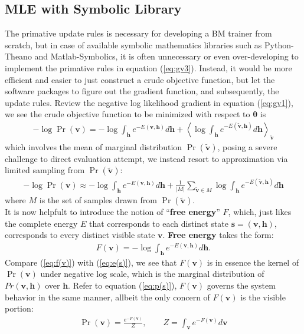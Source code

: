\documentclass[11pt]{article}
\newcommand{\mean}[2]{\left\langle{#1}\right\rangle_{#2}}
\newcommand{\vh}{\boldsymbol{h}}
\newcommand{\vv}{\boldsymbol{v}}
\newcommand{\vs}{\boldsymbol{s}}
\newcommand{\vvt}{\tilde{\vv}}
\newcommand{\pEC}{\boldsymbol{\theta}}
\begin{document}
{\subsection{MLE with Symbolic Library}
The primative update rules is necessary for developing a BM trainer from scratch, but in case of available symbolic mathematics libraries such as Python-Theano and Matlab-Symbolics, it is often unnecessary or even over-developing to implement the primative rules in equation (\ref{eq:gv3}). Instead, it would be more efficient and easier to just construct a crude objective function, but let the software packages to figure out the gradient function, and subsequently, the update rules.
Review the negative log likelihood gradient in equation (\ref{eq:gv1}), we see the crude objective function to be minimized with respect to $\pEC$ is
\begin{align}\label{eq:l(v)1}
  -\log{\Pr(\vv)} = -\log{\int_{\vh}{e^{-E(\vv, \vh)}d\vh}} + \mean{\log{\int_{\vh}{e^{-E(\vvt, \vh)}d\vh}}}{\vvt}
\end{align}
which involves the mean of marginal distribution $\Pr(\vvt)$, posing a severe challenge to direct evaluation attempt, we instead resort to approximation via limited sampling from $\Pr(\vvt)$:
\begin{align}\label{eq:l(v)2}
  -\log{\Pr(\vv)} \approx -\log{\int_{\vh} e^{-E(\vv, \vh)} d\vh} + \frac{1}{|M|}\sum_{\vvt \in M}{\log{\int_{\vh} e^{-E(\vvt, \vh)}d\vh}}
\end{align}
where $M$ is the set of samples drawn from $\Pr(\vvt)$. \\
It is now helpfult to introduce the notion of ``\textbf{free energy}'' $F$, which, just likes the complete energy $E$ that corresponds to each distinct state $\vs=(\vv, \vh)$, corresponds to every distinct visible state $\vv$. \textbf{Free energy} takes the form:
\begin{align}\label{eq:f(v)}
    F(\vv) = -\log{\int_{\vh}{e^{-E(\vv, \vh)}d\vh}}.
\end{align}
Compare (\ref{eq:f(v)}) with (\ref{eq:e(s)}), we see that $F(\vv)$ is in essence the kernel of $\Pr(\vv)$ under negative log scale, which is the marginal distribution of $Pr(\vv, \vh)$ over $\vh$. Refer to equation (\ref{eq:p(s)}), $F(\vv)$ governs the system behavior in the same manner, allbeit the only concern of $F(\vv)$ is the visible portion:
\begin{align}\label{eq:p(v)|fe}
    \Pr(\vv) = \frac{e^{-F(\vv)}}{Z}, \quad\quad Z=\int_{\vv}{e^{-F(\vv)}}d\vv
\end{align}
}
\end{document}

